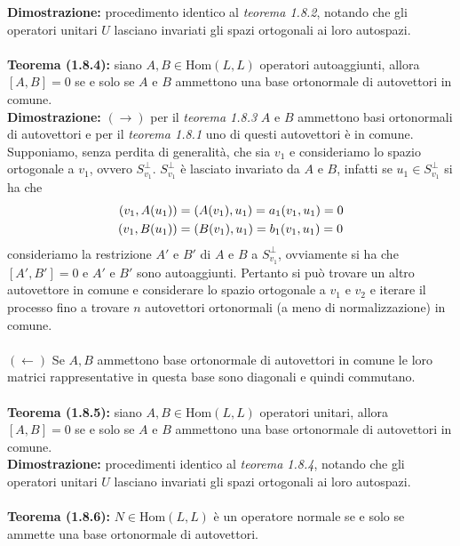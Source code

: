 \documentclass{article}
\begin{document}
\textbf{Dimostrazione:} procedimento identico al \textit{teorema 1.8.2}, notando che gli operatori unitari $U$ lasciano invariati gli spazi ortogonali ai loro autospazi. \\ \\
\textbf{Teorema (1.8.4):} siano $A, B \in \mathrm{Hom}(L, L)$ operatori autoaggiunti, allora $[A, B] = 0$ se e solo se $A$ e $B$ ammettono una base ortonormale di autovettori in comune. \\

\textbf{Dimostrazione:} $(\rightarrow)$ per il \textit{teorema 1.8.3} $A$ e $B$ ammettono basi ortonormali di autovettori e per il \textit{teorema 1.8.1} uno di questi autovettori è in comune. Supponiamo, senza perdita di generalità, che sia $v_1$ e consideriamo lo spazio ortogonale a $v_1$, ovvero $S^\perp_{v_1}$. $S^\perp_{v_1}$ è lasciato invariato da $A$ e $B$, infatti se $u_1 \in S^\perp_{v_1}$ si ha che
\begin{align}
    (v_1, A(u_1)) &= (A(v_1), u_1) = a_1(v_1, u_1) = 0 \notag \\
    (v_1, B(u_1)) &= (B(v_1), u_1) = b_1(v_1, u_1) = 0 \notag
\end{align}
consideriamo la restrizione $A'$ e $B'$ di $A$ e $B$ a $S^\perp_{v_1}$, ovviamente si ha che $[A', B'] = 0$ e $A'$ e $B'$ sono autoaggiunti. Pertanto si può trovare un altro autovettore in comune e considerare lo spazio ortogonale a $v_1$ e $v_2$ e iterare il processo fino a trovare $n$ autovettori ortonormali (a meno di normalizzazione) in comune. \\ \\
$(\leftarrow)$ Se $A, B$ ammettono base ortonormale di autovettori in comune le loro matrici rappresentative in questa base sono diagonali e quindi commutano. \\ \\
\textbf{Teorema (1.8.5):} siano $A, B \in \mathrm{Hom}(L, L)$ operatori unitari, allora $[A, B] = 0$ se e solo se $A$ e $B$ ammettono una base ortonormale di autovettori in comune. \\

\textbf{Dimostrazione:} procedimenti identico al \textit{teorema 1.8.4}, notando che gli operatori unitari $U$ lasciano invariati gli spazi ortogonali ai loro autospazi. \\ \\
\textbf{Teorema (1.8.6):} $N \in \mathrm{Hom}(L, L)$ è un operatore normale se e solo se ammette una base ortonormale di autovettori. \\
\end{document}
